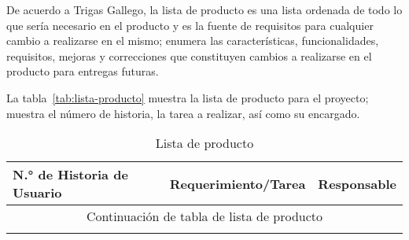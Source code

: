 De acuerdo a Trigas Gallego\cite{manuel_trigas_gallego_metodologiscrum_2020}, la lista de producto es una lista ordenada de todo lo que sería necesario en el producto y es la fuente de requisitos para cualquier cambio a realizarse en el mismo; enumera las características, funcionalidades, requisitos, mejoras y correcciones que constituyen cambios a realizarse en el producto para entregas futuras.

La tabla~\ref{tab:lista-producto} muestra la lista de producto para el proyecto; muestra el número de historia, la tarea a realizar, así como su encargado.


\begin{longtable}{ p{2cm} | p{10cm} | p{2cm} }
	\hline
	N.° de Historia de Usuario & Requerimiento/Tarea & Responsable \\[0.5cm]
	\hline
	\hline

	\endfirsthead

	\multicolumn{3}{c}{Continuación de tabla de lista de producto }\\
	\hline
	\hline
	\endhead

	\hline
	\hline
	\caption{Lista de producto}
	\endlastfoot



\end{longtable}
